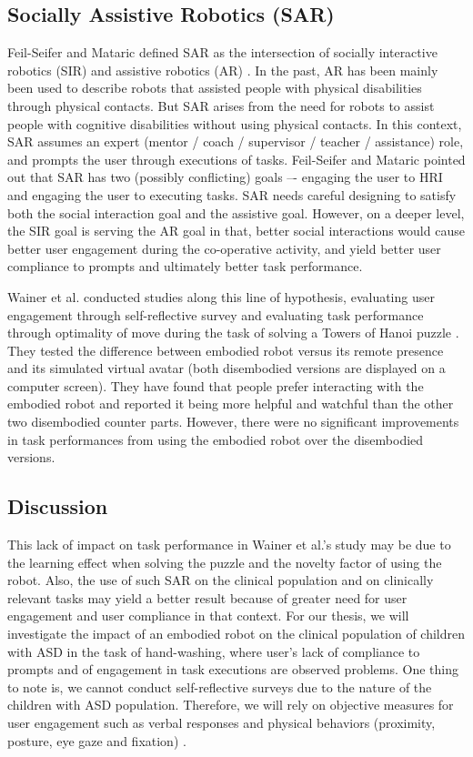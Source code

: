 \subsection{Socially Assistive Robotics (SAR)}
Feil-Seifer and Mataric defined SAR as the intersection of socially interactive robotics (SIR) and assistive robotics (AR) \cite{feil2005defining}.  In the past, AR has been mainly been used to describe robots that assisted people with physical disabilities through physical contacts.  But SAR arises from the need for robots to assist people with cognitive disabilities without using physical contacts.  In this context, SAR assumes an expert (mentor / coach / supervisor / teacher / assistance) role, and prompts the user through executions of tasks.  Feil-Seifer and Mataric pointed out that SAR has two (possibly conflicting) goals –- engaging the user to HRI and engaging the user to executing tasks.  SAR needs careful designing to satisfy both the social interaction goal and the assistive goal.  However, on a deeper level, the SIR goal is serving the AR goal in that, better social interactions would cause better user engagement during the co-operative activity, and yield better user compliance to prompts and ultimately better task performance.


Wainer et al. conducted studies along this line of hypothesis, evaluating user engagement through self-reflective survey and evaluating task performance through optimality of move during the task of solving a Towers of Hanoi puzzle \cite{wainer2007embodiment}.  They tested the difference between embodied robot versus its remote presence and its simulated virtual avatar (both disembodied versions are displayed on a computer screen).  They have found that people prefer interacting with the embodied robot and reported it being more helpful and watchful than the other two disembodied counter parts.  However, there were no significant improvements in task performances from using the embodied robot over the disembodied versions.


\subsection{Discussion}
This lack of impact on task performance in Wainer et al.'s study may be due to the learning effect when solving the puzzle and the novelty factor of using the robot.  Also, the use of such SAR on the clinical population and on clinically relevant tasks may yield a better result because of greater need for user engagement and user compliance in that context.  For our thesis, we will investigate the impact of an embodied robot on the clinical population of children with ASD in the task of hand-washing, where user's lack of compliance to prompts and of engagement in task executions are observed problems.  One thing to note is, we cannot conduct self-reflective surveys due to the nature of the children with ASD population.  Therefore, we will rely on objective measures for user engagement such as verbal responses and physical behaviors (proximity, posture, eye gaze and ﬁxation) \cite{mataric2005role}.


